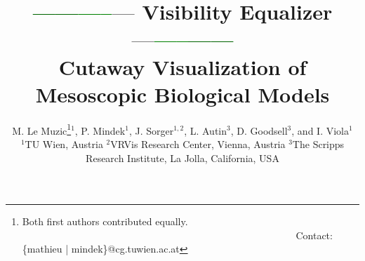 
\usepackage{xcolor}



\title[Visibility Equalizer]%
      {\textcolor{darkgreen}{------}\textcolor{green}{-----}\textcolor{grey}{---} Visibility Equalizer \textcolor{grey}{---}\textcolor{green}{-----}\textcolor{darkgreen}{------} \\ Cutaway Visualization of Mesoscopic Biological Models}

\author[Le Muzic, Mindek et al.]
       {M. Le Muzic\thanks{Both first authors contributed equally. ~~~~~~~~~~~~~~~~~~~~~~~~~~~~~~~~~~~~~~~~~~~~~~~~~~~~~~~ Contact: \{mathieu | mindek\}@cg.tuwien.ac.at}$^{1}$,
        P. Mindek$^{1}$,
        J. Sorger$^{1,2}$,
        L. Autin$^{3}$,
        D. Goodsell$^{3}$,
        and I. Viola$^{1}$        
        \\
         $^1$TU Wien, Austria \hspace{4mm}$^2$VRVis Research Center, Vienna, Austria \hspace{4mm}$^3$The Scripps Research Institute, La Jolla, California, USA
       }



%




